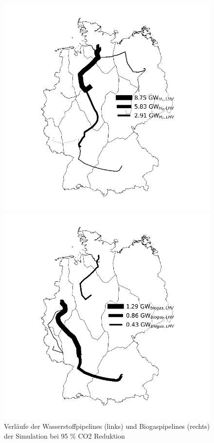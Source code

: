 \begin{figure}[!h]
  \begin{minipage}[b]{.4\linewidth} 
     \includegraphics{images/H2Pipeline-95.png}
  \end{minipage}
  \hspace{.1\linewidth}
  \begin{minipage}[b]{.4\linewidth} 
     \includegraphics{images/BiogasPipeline-95.png}
  \end{minipage}
  \caption{Verläufe der Wasserstoffpipelines (links) und Biogaspipelines (rechts) der Simulation bei 95 \% CO2 Reduktion}
  \label{image:Pipelines-95}
\end{figure}

